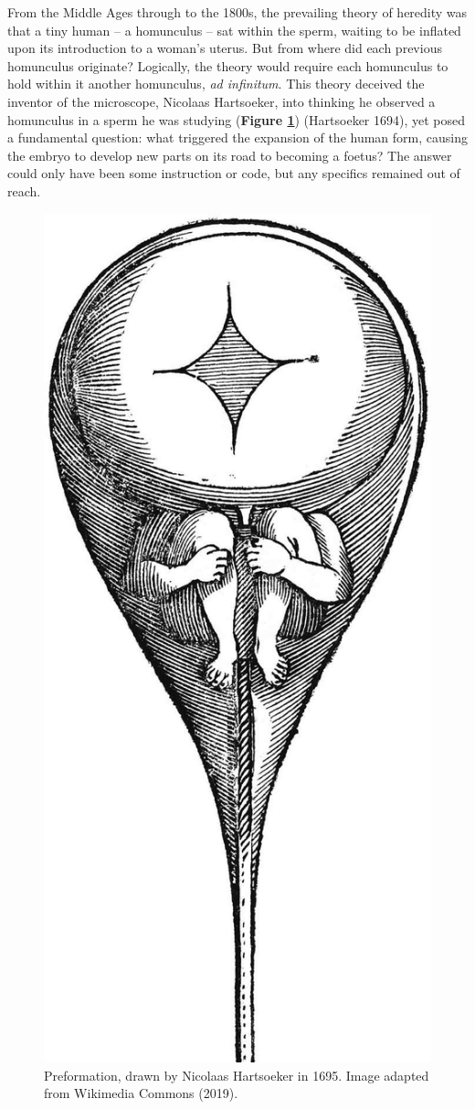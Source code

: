 \documentclass[
]{book}
\begin{document}
From the Middle Ages through to the 1800s, the prevailing theory of heredity was that a tiny human -- a homunculus -- sat within the sperm, waiting to be inflated upon its introduction to a woman's uterus. But from where did each previous homunculus originate? Logically, the theory would require each homunculus to hold within it another homunculus, \emph{ad infinitum}. This theory deceived the inventor of the microscope, Nicolaas Hartsoeker, into thinking he observed a homunculus in a sperm he was studying (\textbf{Figure \ref{fig:homunculus-pic}}) (Hartsoeker 1694), yet posed a fundamental question: what triggered the expansion of the human form, causing the embryo to develop new parts on its road to becoming a foetus? The answer could only have been some instruction or code, but any specifics remained out of reach.



\begin{figure}

{\centering \includegraphics[width=0.5\linewidth]{figs/introduction/homunculus} 

}

\caption{Preformation, drawn by Nicolaas Hartsoeker in 1695. Image adapted from Wikimedia Commons (2019).}\label{fig:homunculus-pic}
\end{figure}
\end{document}
